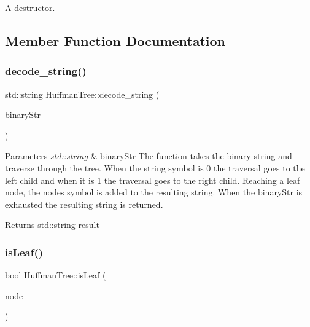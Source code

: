 A destructor. 

\subsection{Member Function Documentation}
\mbox{\label{class_huffman_tree_a9089821533c4ef5b1ac5a4f689757603}} 
\subsubsection{\texorpdfstring{decode\+\_\+string()}{decode\_string()}}
{\footnotesize\ttfamily std\+::string Huffman\+Tree\+::decode\+\_\+string (\begin{DoxyParamCaption}\item[{const std\+::string \&}]{binary\+Str }\end{DoxyParamCaption})}


\begin{DoxyParams}{Parameters}
{\em std\+::string} & binary\+Str The function takes the binary string and traverse through the tree. When the string symbol is \textquotesingle{}0\textquotesingle{} the traversal goes to the left child and when it is \textquotesingle{}1\textquotesingle{} the traversal goes to the right child. Reaching a leaf node, the node\textquotesingle{}s symbol is added to the resulting string. When the binary\+Str is exhausted the resulting string is returned. \\
\hline
\end{DoxyParams}
\begin{DoxyReturn}{Returns}
std\+::string result 
\end{DoxyReturn}
\mbox{\label{class_huffman_tree_acf3a39b33e82f22f88436e6b99809761}} 
\subsubsection{\texorpdfstring{is\+Leaf()}{isLeaf()}}
{\footnotesize\ttfamily bool Huffman\+Tree\+::is\+Leaf (\begin{DoxyParamCaption}\item[{Huffman\+Tree\+Node $\ast$}]{node }\end{DoxyParamCaption})\hspace{0.3cm}{\ttfamily [inline]}}

